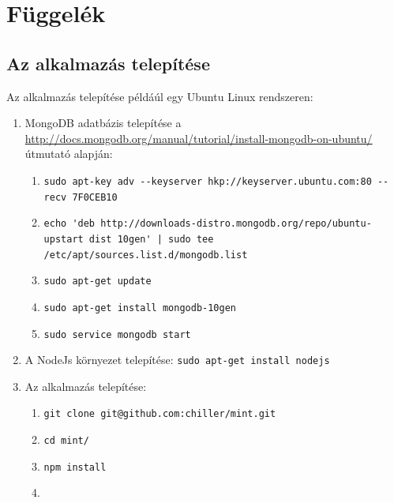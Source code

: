 \appendix
\chapter*{Függelék}
\setcounter{chapter}{6}  %
\setcounter{equation}{0} %

\section{Az alkalmazás telepítése}

Az alkalmazás telepítése példáúl egy Ubuntu Linux rendszeren:

\begin{enumerate}
\item MongoDB adatbázis telepítése a \url{http://docs.mongodb.org/manual/tutorial/install-mongodb-on-ubuntu/} útmutató alapján:
\begin{enumerate}
\item \lstinline{sudo apt-key adv --keyserver hkp://keyserver.ubuntu.com:80 --recv 7F0CEB10}
\item \lstinline{echo 'deb http://downloads-distro.mongodb.org/repo/ubuntu-upstart dist 10gen' | sudo tee /etc/apt/sources.list.d/mongodb.list}
\item \lstinline{sudo apt-get update}
\item \lstinline{sudo apt-get install mongodb-10gen}
\item \lstinline{sudo service mongodb start}
\end{enumerate}

\item A NodeJs környezet telepítése: \lstinline{sudo apt-get install nodejs}
\item Az alkalmazás telepítése:
\begin{enumerate}
\item \lstinline{git clone git@github.com:chiller/mint.git}
\item \lstinline{cd mint/}
\item \lstinline{npm install}
\item 
\end{enumerate}
\end{enumerate}


